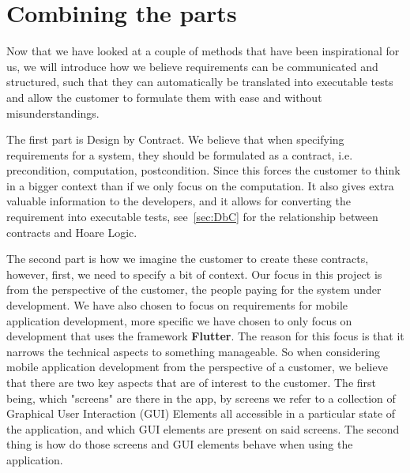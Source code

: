 \section{Combining the parts}\label{sec:combiningtheparts}
Now that we have looked at a couple of methods that have been inspirational for us, we will introduce how we believe requirements can be communicated and structured, such that they can automatically be translated into executable tests and allow the customer to formulate them with ease and without misunderstandings.

The first part is Design by Contract.
We believe that when specifying requirements for a system, they should be formulated as a contract, i.e. precondition, computation, postcondition. 
Since this forces the customer to think in a bigger context than if we only focus on the computation.
It also gives extra valuable information to the developers, and it allows for converting the requirement into executable tests, see~\autoref{sec:DbC} for the relationship between contracts and Hoare Logic.

The second part is how we imagine the customer to create these contracts, however, first, we need to specify a bit of context.
Our focus in this project is from the perspective of the customer, the people paying for the system under development.
We have also chosen to focus on requirements for mobile application development, more specific we have chosen to only focus on development that uses the framework \textbf{Flutter}.
The reason for this focus is that it narrows the technical aspects to something manageable.
So when considering mobile application development from the perspective of a customer, we believe that there are two key aspects that are of interest to the customer.
The first being, which "screens" are there in the app, by screens we refer to a collection of Graphical User Interaction (GUI) Elements all accessible in a particular state of the application, and which GUI elements are present on said screens.
The second thing is how do those screens and GUI elements behave when using the application.

